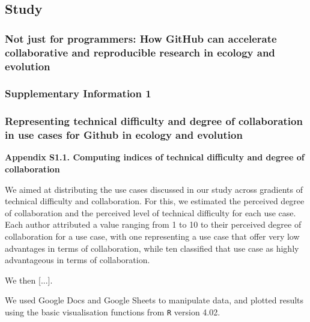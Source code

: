 \documentclass[
  11pt,
]{article}
\author{}
\date{\vspace{-2.5em}}
\begin{document}
\hypertarget{study}{%
\subsection{Study}\label{study}}

\hypertarget{not-just-for-programmers-how-github-can-accelerate-collaborative-and-reproducible-research-in-ecology-and-evolution}{%
\subsubsection{Not just for programmers: How GitHub can accelerate collaborative and reproducible research in ecology and evolution}\label{not-just-for-programmers-how-github-can-accelerate-collaborative-and-reproducible-research-in-ecology-and-evolution}}

\hypertarget{supplementary-information-1}{%
\subsubsection{Supplementary Information 1}\label{supplementary-information-1}}

\hypertarget{representing-technical-difficulty-and-degree-of-collaboration-in-use-cases-for-github-in-ecology-and-evolution}{%
\subsubsection{Representing technical difficulty and degree of collaboration in use cases for Github in ecology and evolution}\label{representing-technical-difficulty-and-degree-of-collaboration-in-use-cases-for-github-in-ecology-and-evolution}}

\textbf{Appendix S1.1. Computing indices of technical difficulty and degree of collaboration}

We aimed at distributing the use cases discussed in our study across gradients of technical difficulty and collaboration.
For this, we estimated the perceived degree of collaboration and the perceived level of technical difficulty for each use case.
Each author attributed a value ranging from 1 to 10 to their perceived degree of collaboration for a use case, with one representing a use case that offer very low advantages in terms of collaboration, while ten classified that use case as highly advantageous in terms of collaboration.

We then {[}...{]}.

We used Google Docs and Google Sheets to manipulate data, and plotted results using the basic visualisation functions from \texttt{R} version 4.02.
\end{document}
